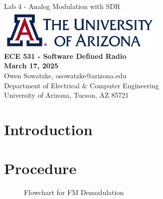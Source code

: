 \documentclass{article}
\begin{document}
\begin{titlepage}
	\centering
	{\huge Lab 4 - Analog Modulation with SDR}\\[0.25 in]
	\includegraphics[width=0.6\textwidth]{ua_logo.png}\\[0.25 in]
	{\large \textbf{ECE 531 - Software Defined Radio\\[0.25 in]
	March 17, 2025\\[0.25 in]}}
	{\large Owen Sowatzke, osowatzke@arizona.edu\\[0.05 in]
	Department of Electrical \& Computer Engineering\\[0.05 in]
	University of Arizona, Tucson, AZ 85721\\[0.5 in]}
	\hypersetup{linkcolor=navy-blue}
	\noindent\hrulefill
	\tableofcontents
	\noindent\hrulefill
\end{titlepage}

\setlength{\parindent}{0pt}

\section{Introduction}

\section{Procedure}

\begin{figure}[H]
	\centerline{}
	\caption{Flowchart for FM Demodulation}
	\label{fig::fm_radio_flowchart}
\end{figure}
\end{document}
